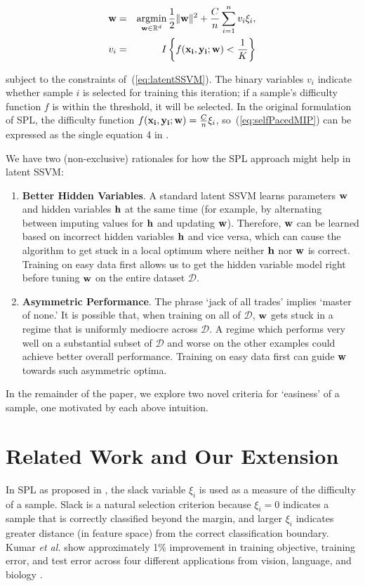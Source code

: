 \documentclass{article}
\newcommand{\mysection}[1]{\vspace{-4mm}\section{#1}\vspace{-4mm}}
\newcommand{\argmin}{\operatornamewithlimits{argmin}}
\begin{document}
\begin{eqnarray}
{\bf w} &=& \argmin_{{\bf w} \in \mathbb{R}^d}
\frac{1}{2}\|{\bf w}\|^2 + \frac{C}{n}\sum_{i=1}^n v_i \xi_i, \nonumber \\
{v}_i &=& I \left\{ f({\bf x_i},{\bf y_i};{\bf w}) < \frac{1}{K} \right\}
\label{eq:selfPacedMIP}
\end{eqnarray}

subject to the constraints of~(\ref{eq:latentSSVM}). The binary variables $v_i$ indicate whether sample $i$ is selected for training this iteration; if a sample's difficulty function $f$ is within the threshold, it will be selected.  In the original formulation of SPL, the difficulty function $f({\bf x_i, \bf y_i; \bf w}) = \frac{C}{n}\xi_i$, so~(\ref{eq:selfPacedMIP}) can be expressed as the single equation 4 in \cite{SPL}.

We have two (non-exclusive) rationales for how the SPL approach might help in latent SSVM:

\begin{enumerate}
\item \textbf{Better Hidden Variables}.  A standard latent SSVM learns parameters $\bf w$ and hidden variables $\bf h$ at the same time (for example, by alternating between imputing values for $\bf h$ and updating $\bf w$).  Therefore, $\bf w$ can be learned based on incorrect hidden variables $\bf h$ and vice versa, which can cause the algorithm to get stuck in a local optimum where neither $\bf h$ nor $\bf w$ is correct. Training on easy data first allows us to get the hidden variable model right before tuning $\bf w$ on the entire dataset $\mathcal D$.
\item \textbf{Asymmetric Performance}. The phrase `jack of all trades' implies `master of none.'  It is possible that, when training on all of $\mathcal D$, $\bf w$ gets stuck in a regime that is uniformly mediocre across $\mathcal D$. A regime which performs very well on a substantial subset of $\mathcal D$ and worse on the other examples could achieve better overall performance. Training on easy data first can guide $\bf w$ towards such asymmetric optima.
\end{enumerate}

In the remainder of the paper, we explore two novel criteria for `easiness' of a sample, one motivated by each above intuition.

\mysection{Related Work and Our Extension}
\label{sec:related}
In SPL as proposed in \cite{SPL}, the slack variable $\xi_i$ is used as a measure of the difficulty of a sample.  Slack is a natural selection criterion because $\xi_i=0$ indicates a sample that is correctly classified beyond the margin, and larger $\xi_i$ indicates greater distance (in feature space) from the correct classification boundary. Kumar \textit{et al.} show approximately 1\% improvement in training objective, training error, and test error across four different applications from vision, language, and biology \cite{SPL}.
\end{document}
